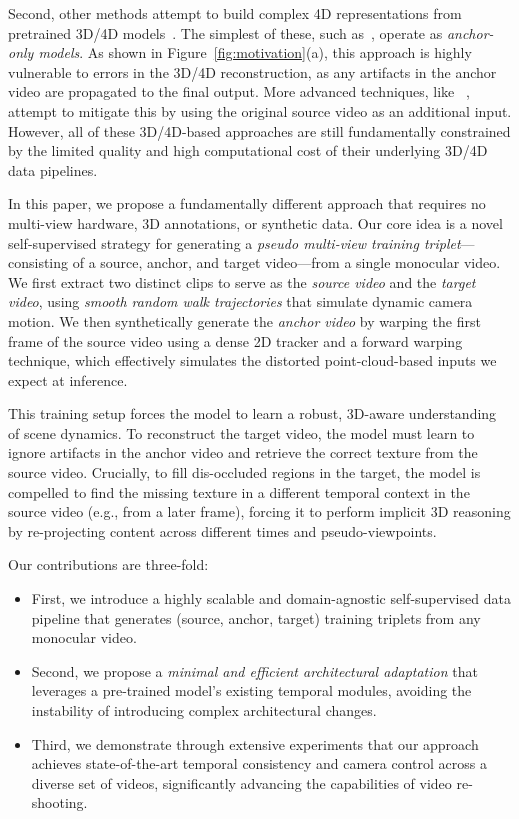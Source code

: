 Second, other methods attempt to build complex 4D representations from pretrained 3D/4D models~\cite{4d_recon_harley2025alltracker,4d_recon_hu2025depthcrafter,4d_recon_wang2024dust3r}. The simplest of these, such as~\cite{ex4d}, operate as \textit{anchor-only models}. As shown in Figure~\ref{fig:motivation}(a), this approach is highly vulnerable to errors in the 3D/4D reconstruction, as any artifacts in the anchor video are propagated to the final output. More advanced techniques, like \trajectorycrafter{}~\cite{yu2025trajectorycrafter}, attempt to mitigate this by using the original source video as an additional input. However, all of these 3D/4D-based approaches are still fundamentally constrained by the limited quality and high computational cost of their underlying 3D/4D data pipelines.

In this paper, we propose a fundamentally different approach that requires no multi-view hardware, 3D annotations, or synthetic data. Our core idea is a novel self-supervised strategy for generating a \textit{pseudo multi-view training triplet}—consisting of a source, anchor, and target video—from a single monocular video. We first extract two distinct clips to serve as the \textit{source video} and the \textit{target video}, using \textit{smooth random walk trajectories} that simulate dynamic camera motion. We then synthetically generate the \textit{anchor video} by warping the first frame of the source video using a dense 2D tracker and a forward warping technique, which effectively simulates the distorted point-cloud-based inputs we expect at inference.

This training setup forces the model to learn a robust, 3D-aware understanding of scene dynamics. To reconstruct the target video, the model must learn to ignore artifacts in the anchor video and retrieve the correct texture from the source video. Crucially, to fill dis-occluded regions in the target, the model is compelled to find the missing texture in a different temporal context in the source video (e.g., from a later frame), forcing it to perform implicit 3D reasoning by re-projecting content across different times and pseudo-viewpoints.

Our contributions are three-fold:
\begin{itemize}[noitemsep, topsep=0pt, partopsep=0pt]
    \item First, we introduce a highly scalable and domain-agnostic self-supervised data pipeline that generates (source, anchor, target) training triplets from any monocular video.
    \item Second, we propose a \textit{minimal and efficient architectural adaptation} that leverages a pre-trained model's existing temporal modules, avoiding the instability of introducing complex architectural changes.
    \item Third, we demonstrate through extensive experiments that our approach achieves state-of-the-art temporal consistency and camera control across a diverse set of videos, significantly advancing the capabilities of video re-shooting.
\end{itemize}